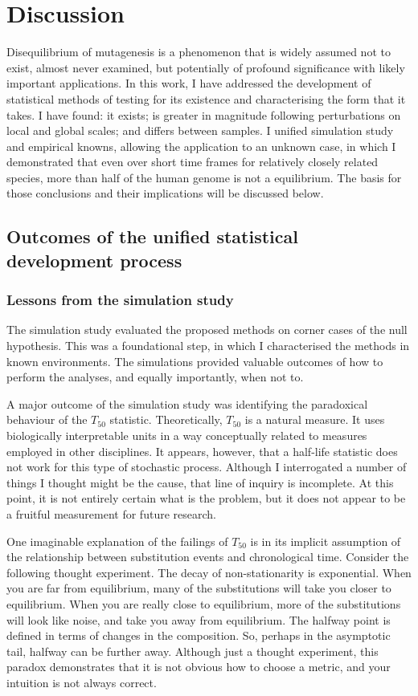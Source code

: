 \chapter{Discussion}

Disequilibrium of mutagenesis is a phenomenon that is widely assumed not to exist, almost never examined, but potentially of profound significance with likely important applications. In this work, I have addressed the development of statistical methods of testing for its existence and characterising the form that it takes. I have found: it exists; is greater in magnitude following perturbations on local and global scales; and differs between samples. I unified simulation study and empirical knowns, allowing the application to an unknown case, in which I demonstrated that even over short time frames for relatively closely related species, more than half of the human genome is not a equilibrium. The basis for those conclusions and their implications will be discussed below. 

\section{Outcomes of the unified statistical development process}

\subsection{Lessons from the simulation study}

The simulation study evaluated the proposed methods on corner cases of the null hypothesis. This was a foundational step, in which I characterised the methods in known environments. The simulations provided valuable outcomes of how to perform the analyses, and equally importantly, when not to. 

A major outcome of the simulation study was identifying the paradoxical behaviour of the $T_{50}$ statistic. Theoretically, $T_{50}$ is a natural measure. It uses biologically interpretable units in a way conceptually related to measures employed in other disciplines. It appears, however, that a half-life statistic does not work for this type of stochastic process. Although I interrogated a number of things I thought might be the cause, that line of inquiry is incomplete. At this point, it is not entirely certain what is the problem, but it does not appear to be a fruitful measurement for future research. 

One imaginable explanation of the failings of $T_{50}$ is in its implicit assumption of the relationship between substitution events and chronological time. Consider the following thought experiment. The decay of non-stationarity is exponential. When you are far from equilibrium, many of the substitutions will take you closer to equilibrium. When you are really close to equilibrium, more of the substitutions will look like noise, and take you away from equilibrium. The halfway point is defined in terms of changes in the composition. So, perhaps in the asymptotic tail, halfway can be further away. Although just a thought experiment, this paradox demonstrates that it is not obvious how to choose a metric, and your intuition is not always correct. 

